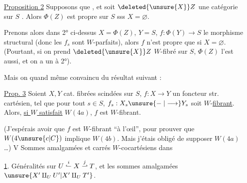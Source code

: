 \uline{Proposition 2} Supposons que
, et soit $\deleted{\unsure{X}}Z$ une catégorie sur $S$ . Alors $\Phi(Z)$ est propre sur $S$ sss $X=\varnothing$.

Prenons alors dans 2° ci-dessus $X=\Phi(Z)$, $Y=S$, $f:\Phi(Y)\longrightarrow S$ le morphisme structural (donc les $f_s$ sont $W$-parfaits), alors $f$ n'est propre que si $X=\varnothing$. (Pourtant, si on prend $\deleted{\unsure{X}}Z$ $W$-fibré sur $S$, $\Phi(Z)$ l'est aussi, et on a un  à 2°).

Mais on  quand même convaincu du résultat suivant :

\uline{Prop. 3} Soient $X,Y$ cat. fibrées scindées sur $S$, $f:X\longrightarrow Y$ un foncteur str. cartésien, tel que
pour tout $s\in S$, $f_s:X_s\unsure{\relbar|\longrightarrow}Y_s$ soit $W$-\uline{fibrant}. Alors, \uline{si $W$ satisfait} $W(4a)$, $f$ est $W$-fibrant.

(J'espérais avoir que $f$ est $W$-fibrant ``à l'œil'', pour prouver que $W(4\unsure{c|C})$ implique $W(4b)$. Mais j'étais obligé de supposer $W(4a)$ \ldots)
V Sommes amalgamées et carrés $W$-cocartésiens dans 

\uline{1}. Généralités sur $U\overset{i}{\lhook\joinrel\relbar}X\overset{j}{\relbar\joinrel\rhook}T$, et les sommes amalgamées $\unsure{X'\amalg_U U'|X'\amalg_U T'}$.

